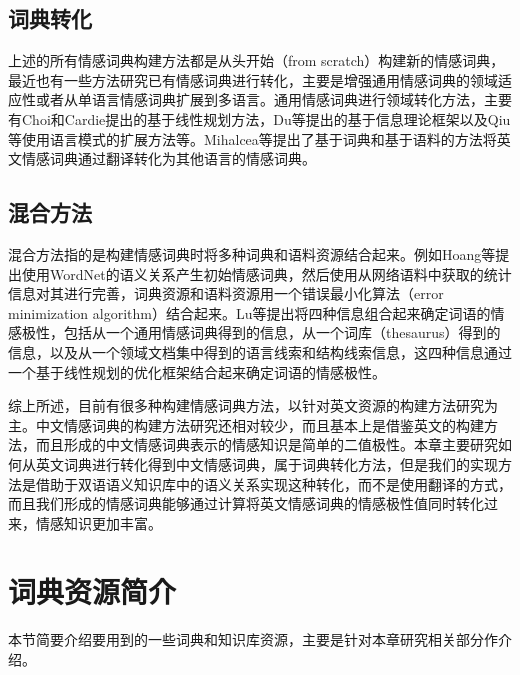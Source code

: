 \subsection{词典转化}
上述的所有情感词典构建方法都是从头开始（from scratch）构建新的情感词典，最近也有一些方法研究已有情感词典进行转化，主要是增强通用情感词典的领域适应性或者从单语言情感词典扩展到多语言。通用情感词典进行领域转化方法，主要有Choi和Cardie提出的基于线性规划方法，Du等提出的基于信息理论框架以及Qiu等使用语言模式的扩展方法等。Mihalcea等提出了基于词典和基于语料的方法将英文情感词典通过翻译转化为其他语言的情感词典。

\subsection{混合方法}
混合方法指的是构建情感词典时将多种词典和语料资源结合起来。例如Hoang等提出使用WordNet的语义关系产生初始情感词典，然后使用从网络语料中获取的统计信息对其进行完善，词典资源和语料资源用一个错误最小化算法（error minimization algorithm）结合起来。Lu等提出将四种信息组合起来确定词语的情感极性，包括从一个通用情感词典得到的信息，从一个词库（thesaurus）得到的信息，以及从一个领域文档集中得到的语言线索和结构线索信息，这四种信息通过一个基于线性规划的优化框架结合起来确定词语的情感极性。

综上所述，目前有很多种构建情感词典方法，以针对英文资源的构建方法研究为主。中文情感词典的构建方法研究还相对较少，而且基本上是借鉴英文的构建方法，而且形成的中文情感词典表示的情感知识是简单的二值极性。本章主要研究如何从英文词典进行转化得到中文情感词典，属于词典转化方法，但是我们的实现方法是借助于双语语义知识库中的语义关系实现这种转化，而不是使用翻译的方式，而且我们形成的情感词典能够通过计算将英文情感词典的情感极性值同时转化过来，情感知识更加丰富。



\section{词典资源简介}
\label{ch2:lex}
本节简要介绍要用到的一些词典和知识库资源，主要是针对本章研究相关部分作介绍。
